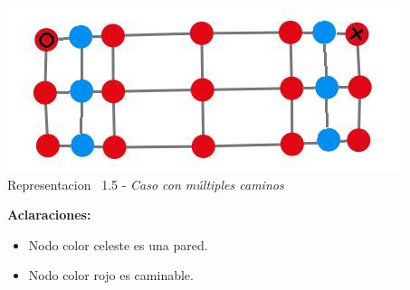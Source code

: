 \vspace*{0.3cm} \vspace*{0.3cm}
  \begin{center}
 \includegraphics[scale=0.5]{./EJ1/ej1graforandom.jpeg}
 \\{Representacion \ 1.5 - \textit{Caso con m\'ultiples caminos}}
  \end{center}
  \vspace*{0.3cm}

\textbf{Aclaraciones:} 
\begin{itemize}
\item Nodo color celeste es una pared.
\item Nodo color rojo es caminable.
\end{itemize}
